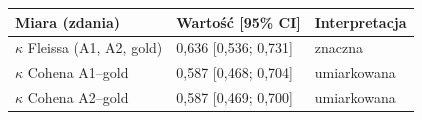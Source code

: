 \begin{tabular}{lll}
\toprule
Miara (zdania) & Wartość [95\% CI] & Interpretacja \\
\midrule
$\kappa$ Fleissa (A1, A2, gold) & 0{,}636 [0{,}536; 0{,}731] & znaczna \\
$\kappa$ Cohena A1--gold & 0{,}587 [0{,}468; 0{,}704] & umiarkowana \\
$\kappa$ Cohena A2--gold & 0{,}587 [0{,}469; 0{,}700] & umiarkowana \\
\bottomrule
\end{tabular}
